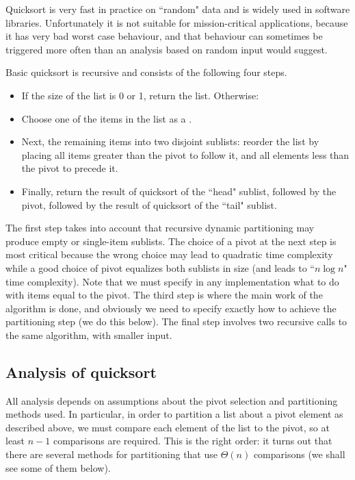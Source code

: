 Quicksort is very fast in practice on ``random" data and is widely used in 
software libraries. Unfortunately it is not suitable for mission-critical 
applications, because it has very bad worst case behaviour, and that behaviour 
can sometimes be triggered more often than an analysis based on random input 
would suggest.

Basic quicksort is recursive and consists of the following four steps. 

\begin{itemize}
\item  If the size of the list is 0 or 1, return the list. Otherwise:
\item Choose one of the items in the list as a . 
\item Next,  the remaining items into two disjoint sublists: 
reorder the list by placing all items greater than the pivot to follow it,
 and all elements less than the pivot to precede it.
\item Finally, return the result of quicksort of the ``head" sublist,
followed by the pivot, followed by the result of quicksort
of the ``tail" sublist.
\end{itemize}

The first step takes into account that recursive dynamic partitioning may produce 
empty or single-item sublists. The choice of a pivot at the next step is most 
critical because the wrong choice may lead to quadratic time complexity while a 
good choice of pivot equalizes both sublists in size (and leads to ``$n\log n$" 
time complexity). Note that we must specify
in any implementation what to do with items equal to the pivot. The third step is 
where the main work of the algorithm is done, and obviously we need to specify 
exactly how to achieve the partitioning step (we do this below). The final step
involves two recursive calls to the same algorithm, with smaller input.

\subsection*{Analysis of quicksort}

All analysis depends on assumptions about the pivot selection and partitioning 
methods used. In particular, in order to partition a list about a pivot element
as described above, we must compare each element of the list to the 
pivot, so at least $n-1$ comparisons are required. This is the right order: 
it turns out that there are several methods for partitioning that use 
$\Theta(n)$ comparisons (we shall see some of them below).

